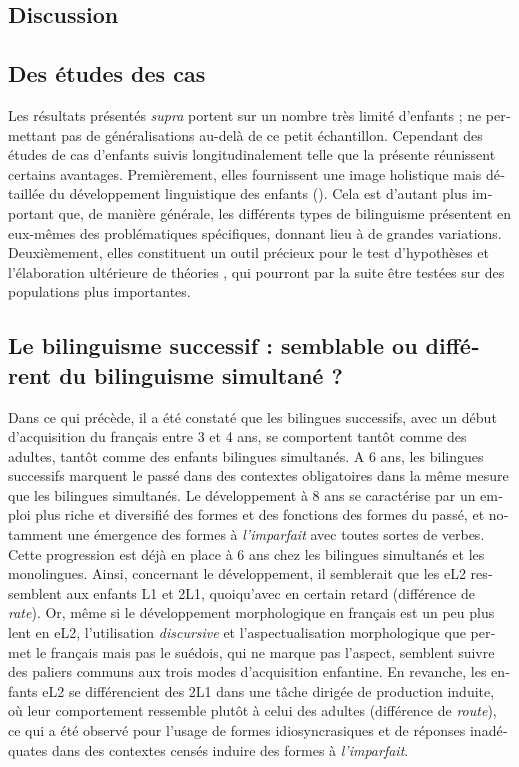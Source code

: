 \documentclass[french, output=paper]{langscibook}
\begin{document}
\begin{otherlanguage}{french}
\section{Discussion}\label{sec:kihlstedt:6}

\subsection{Des études des cas}\label{sec:kihlstedt:6.1}

Les résultats présentés \textit{supra} portent sur un nombre très limité d’enfants ; ne permettant pas de généralisations au-delà de ce petit échantillon. Cependant des études de cas d’enfants suivis longitudinalement telle que la présente réunissent certains avantages. Premièrement, elles fournissent une image holistique mais détaillée du développement linguistique des enfants (\citealt{LindqvistBardel2014, VallerossaBardelàparaître}). Cela est d’autant plus important que, de manière générale, les différents types de bilinguisme présentent en eux-mêmes des problématiques spécifiques, donnant lieu à de grandes variations. Deuxièmement, elles constituent un outil précieux pour le test d’hypothèses et l’élaboration ultérieure de théories \citep{Hammarberg2022}, qui pourront par la suite être testées sur des populations plus importantes. 


\subsection{Le bilinguisme successif : semblable ou différent du bilinguisme simultané ?}\label{sec:kihlstedt:6.2}

Dans ce qui précède, il a été constaté que les bilingues successifs, avec un début d’acquisition du français entre 3 et 4 ans, se comportent tantôt comme des adultes, tantôt comme des enfants bilingues simultanés. A 6 ans, les bilingues successifs marquent le passé dans des contextes obligatoires dans la même mesure que les bilingues simultanés. Le développement à 8 ans se caractérise par un emploi plus riche et diversifié des formes et des fonctions des formes du passé, et notamment une émergence des formes à \textit{l’imparfait} avec toutes sortes de verbes. Cette progression est déjà en place à 6 ans chez les bilingues simultanés et les monolingues. Ainsi, concernant le développement, il semblerait que les eL2 ressemblent aux enfants L1 et 2L1, quoiqu’avec en certain retard (différence de \textit{rate}). Or, même si le développement morphologique en français est un peu plus lent en eL2, l’utilisation \textit{discursive} et l’aspectualisation morphologique que permet le français mais pas le suédois, qui ne marque pas l’aspect, semblent suivre des paliers communs aux trois modes d’acquisition enfantine. En revanche, les enfants eL2 se différencient des 2L1 dans une tâche dirigée de production induite, où leur comportement ressemble plutôt à celui des adultes (différence de \textit{route}), ce qui a été observé pour l’usage de formes idiosyncrasiques et de réponses inadéquates dans des contextes censés induire des formes à \textit{l’imparfait}.



\end{otherlanguage}
\end{document}
